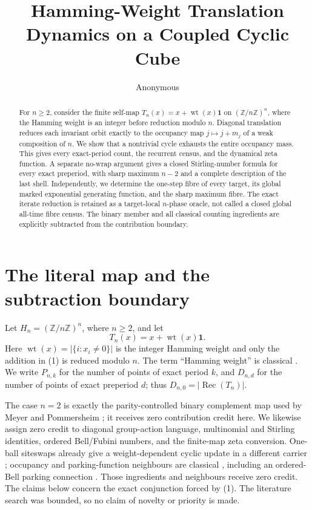 \documentclass[a4paper,10pt]{amsart}
\title[Hamming-weight translation dynamics]{Hamming-Weight Translation Dynamics on a Coupled Cyclic Cube}
\author{Anonymous}
\date{}
\theoremstyle{remark}
\newcommand{\Z}{\mathbb Z}
\newcommand{\one}{\mathbf 1}
\newcommand{\wt}{\operatorname{wt}}
\newcommand{\Rec}{\operatorname{Rec}}
\begin{document}
\begin{abstract}
For $n\geq2$, consider the finite self-map
$T_n(x)=x+\wt(x)\mathbf1$ on $(\mathbb Z/n\mathbb Z)^n$, where the
Hamming weight is an integer before reduction modulo $n$.  Diagonal
translation reduces each invariant orbit exactly to the occupancy map
$j\mapsto j+m_j$ of a weak composition of $n$.  We show that a nontrivial
cycle exhausts the entire occupancy mass.  This gives every exact-period
count, the recurrent census, and the dynamical zeta function.  A separate
no-wrap argument gives a closed Stirling-number formula for every exact
preperiod, with sharp maximum $n-2$ and a complete description of the last
shell.  Independently, we determine the one-step fibre of every target,
its global marked exponential generating function, and the sharp maximum
fibre.  The exact iterate reduction is retained as a target-local
$n$-phase oracle, not called a closed global all-time fibre census.  The
binary member and all classical counting ingredients are explicitly
subtracted from the contribution boundary.
\end{abstract}

\maketitle

\section{The literal map and the subtraction boundary}

Let $H_n=(\Z/n\Z)^n$, where $n\geq2$, and let
\begin{equation}\label{eq:literal}
 T_n(x)=x+\wt(x)\one .
\end{equation}
Here $\wt(x)=|\{i:x_i\ne0\}|$ is the integer Hamming weight and only the
addition in (1) is reduced modulo $n$.  The term ``Hamming weight'' is
classical \cite{Hamming1950}.  We write $P_{n,k}$ for the number of points
of exact period $k$, and $D_{n,d}$ for the number of points of exact
preperiod $d$; thus $D_{n,0}=|\Rec(T_n)|$.

The case $n=2$ is exactly the parity-controlled binary complement map used
by Meyer and Pommersheim \cite{MeyerPommersheim2010}; it receives zero
contribution credit here.  We likewise assign zero credit to diagonal
group-action language, multinomial and Stirling identities, ordered
Bell/Fubini numbers, and the finite-map zeta conversion.  One-ball
siteswaps already give a weight-dependent cyclic update in a different
carrier \cite{BuhlerEtAl1994}; occupancy and parking-function neighbours
are classical \cite{KonheimWeiss1966,LacknerPanholzer2016}, including an
ordered-Bell parking connection \cite{MeylesEtAl2023}.  Those ingredients
and neighbours receive zero credit.  The claims below concern the exact
conjunction forced by (1).  The literature search was bounded, so no
claim of novelty or priority is made.
\end{document}
